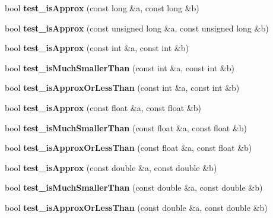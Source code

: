 \begin{DoxyCompactItemize}
bool {\bfseries test\+\_\+is\+Approx} (const long \&a, const long \&b)
\item 
\mbox{\label{namespace_eigen_ad1d223e226679a2cf87247cef0f6f20b}} 
bool {\bfseries test\+\_\+is\+Approx} (const unsigned long \&a, const unsigned long \&b)
\item 
\mbox{\label{namespace_eigen_a5e39e74c578b5c34e271e4e9a6c9d78e}} 
bool {\bfseries test\+\_\+is\+Approx} (const int \&a, const int \&b)
\item 
\mbox{\label{namespace_eigen_a6a0c30775a04443b5ab0c84e9771f1f1}} 
bool {\bfseries test\+\_\+is\+Much\+Smaller\+Than} (const int \&a, const int \&b)
\item 
\mbox{\label{namespace_eigen_a4a04a766a37403320f4c2e041e961611}} 
bool {\bfseries test\+\_\+is\+Approx\+Or\+Less\+Than} (const int \&a, const int \&b)
\item 
\mbox{\label{namespace_eigen_a55a39c38729e09f7c063ba3123844109}} 
bool {\bfseries test\+\_\+is\+Approx} (const float \&a, const float \&b)
\item 
\mbox{\label{namespace_eigen_afc89b445f81da9a90bf49c04bee06a7d}} 
bool {\bfseries test\+\_\+is\+Much\+Smaller\+Than} (const float \&a, const float \&b)
\item 
\mbox{\label{namespace_eigen_a755e94a14780f5a484e00bc293b6bff4}} 
bool {\bfseries test\+\_\+is\+Approx\+Or\+Less\+Than} (const float \&a, const float \&b)
\item 
\mbox{\label{namespace_eigen_a22db8f232d6d08d9d2d1e6831d7ba397}} 
bool {\bfseries test\+\_\+is\+Approx} (const double \&a, const double \&b)
\item 
\mbox{\label{namespace_eigen_a6e42168c36f423ec3a77dac57eb67e74}} 
bool {\bfseries test\+\_\+is\+Much\+Smaller\+Than} (const double \&a, const double \&b)
\item 
\mbox{\label{namespace_eigen_a6f7d5de499e3bfb44c6e433f4e791405}} 
bool {\bfseries test\+\_\+is\+Approx\+Or\+Less\+Than} (const double \&a, const double \&b)

\end{DoxyCompactItemize}
